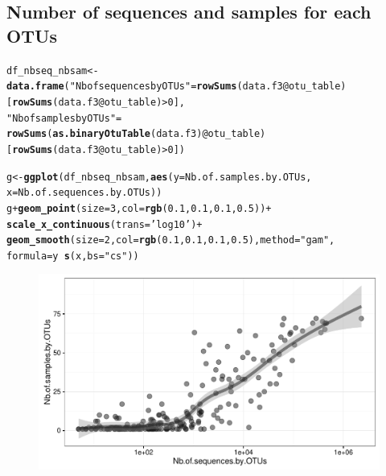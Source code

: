 \documentclass[12pt]{article}\usepackage[]{graphicx}\usepackage[]{color}
\makeatletter
\def\maxwidth{ %
  \ifdim\Gin@nat@width>\linewidth
    \linewidth
  \else
    \Gin@nat@width
  \fi
}
\newcommand{\hlnum}[1]{\textcolor[rgb]{0.686,0.059,0.569}{#1}}%
\newcommand{\hlstr}[1]{\textcolor[rgb]{0.192,0.494,0.8}{#1}}%
\newcommand{\hlopt}[1]{\textcolor[rgb]{0,0,0}{#1}}%
\newcommand{\hlstd}[1]{\textcolor[rgb]{0.345,0.345,0.345}{#1}}%
\newcommand{\hlkwb}[1]{\textcolor[rgb]{0.69,0.353,0.396}{#1}}%
\newcommand{\hlkwc}[1]{\textcolor[rgb]{0.333,0.667,0.333}{#1}}%
\newcommand{\hlkwd}[1]{\textcolor[rgb]{0.737,0.353,0.396}{\textbf{#1}}}%
\newenvironment{kframe}{%
 \def\at@end@of@kframe{}%
 \ifinner\ifhmode%
  \def\at@end@of@kframe{\end{minipage}}%
  \begin{minipage}{\columnwidth}%
 \fi\fi%
 \def\FrameCommand##1{\hskip\@totalleftmargin \hskip-\fboxsep
 \colorbox{shadecolor}{##1}\hskip-\fboxsep
     \hskip-\linewidth \hskip-\@totalleftmargin \hskip\columnwidth}%
 \MakeFramed {\advance\hsize-\width
   \@totalleftmargin\z@ \linewidth\hsize
   \@setminipage}}%
 {\par\unskip\endMakeFramed%
 \at@end@of@kframe}
\newenvironment{knitrout}{}{} %
\numberwithin{figure}{section}
\makeatother
\begin{document}
  \subsection{Number of sequences and samples for each OTUs}
  
\begin{knitrout}\small
{}\color{fgcolor}\begin{kframe}
\begin{alltt}
\hlstd{df_nbseq_nbsam} \hlkwb{<-} \hlkwd{data.frame}\hlstd{(}\hlstr{"Nb of sequences by OTUs"} \hlstd{=} \hlkwd{rowSums}\hlstd{(data.f3}\hlopt{@}\hlkwc{otu_table}\hlstd{)}
                             \hlstd{[}\hlkwd{rowSums}\hlstd{(data.f3}\hlopt{@}\hlkwc{otu_table}\hlstd{)} \hlopt{>} \hlnum{0}\hlstd{],}
                             \hlstr{"Nb of samples by OTUs"} \hlstd{=}
                               \hlkwd{rowSums}\hlstd{(}\hlkwd{as.binaryOtuTable}\hlstd{(data.f3)}\hlopt{@}\hlkwc{otu_table}\hlstd{)}
                             \hlstd{[}\hlkwd{rowSums}\hlstd{(data.f3}\hlopt{@}\hlkwc{otu_table}\hlstd{)} \hlopt{>} \hlnum{0}\hlstd{])}

\hlstd{g} \hlkwb{<-} \hlkwd{ggplot}\hlstd{(df_nbseq_nbsam,} \hlkwd{aes}\hlstd{(}\hlkwc{y} \hlstd{= Nb.of.samples.by.OTUs,}
                                \hlkwc{x} \hlstd{= Nb.of.sequences.by.OTUs))}
\hlstd{g} \hlopt{+} \hlkwd{geom_point}\hlstd{(}\hlkwc{size} \hlstd{=} \hlnum{3}\hlstd{,} \hlkwc{col} \hlstd{=} \hlkwd{rgb}\hlstd{(}\hlnum{0.1}\hlstd{,} \hlnum{0.1}\hlstd{,} \hlnum{0.1}\hlstd{,} \hlnum{0.5}\hlstd{))} \hlopt{+}
  \hlkwd{scale_x_continuous}\hlstd{(}\hlkwc{trans} \hlstd{=} \hlstr{'log10'}\hlstd{)} \hlopt{+}
  \hlkwd{geom_smooth}\hlstd{(}\hlkwc{size} \hlstd{=} \hlnum{2}\hlstd{,} \hlkwc{col} \hlstd{=} \hlkwd{rgb}\hlstd{(}\hlnum{0.1}\hlstd{,} \hlnum{0.1}\hlstd{,} \hlnum{0.1}\hlstd{,} \hlnum{0.5}\hlstd{),} \hlkwc{method} \hlstd{=} \hlstr{"gam"}\hlstd{,}
              \hlkwc{formula}  \hlstd{= y} \hlopt{~} \hlkwd{s}\hlstd{(x,} \hlkwc{bs} \hlstd{=} \hlstr{"cs"}\hlstd{))}
\end{alltt}
\end{kframe}\begin{figure}

{\centering \includegraphics[width=\maxwidth]{figure/unnamed-chunk-21-1} 

}
\end{figure}
\end{knitrout}
\end{document}
